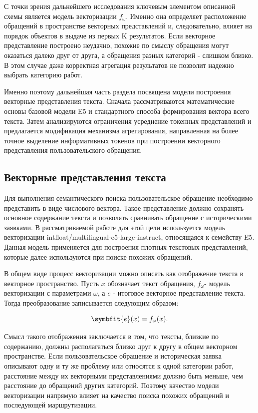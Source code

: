\documentclass[14pt,a4paper]{extarticle}
\numberwithin{figure}{section}
\numberwithin{table}{section}
\begin{document}
С точки зрения дальнейшего исследования ключевым элементом описанной
схемы является модель векторизации \(f_{\omega}\). Именно она определяет
расположение обращений в пространстве векторных представлений и, следовательно, влияет
на порядок объектов в выдаче из первых K результатов. Если векторное представление построено неудачно,
похожие по смыслу обращения могут оказаться далеко друг от друга, а
обращения разных категорий - слишком близко. В этом случае даже
корректная агрегация результатов не позволит надежно выбрать категорию
работ.

Именно поэтому дальнейшая часть раздела посвящена модели построения
векторные представления текста. Сначала рассматриваются математические основы
базовой модели E5 и стандартного способа формирования вектора всего
текста. Затем анализируются ограничения усреднение токенных представлений и предлагается
модификация механизма агрегирования, направленная на более точное выделение
информативных токенов при построении векторного представления пользовательского
обращения.

\subsection{Векторные представления текста}

Для выполнения семантического поиска пользовательское обращение
необходимо представить в виде числового вектора. Такое представление
должно сохранять основное содержание текста и позволять сравнивать
обращение с историческими заявками. В рассматриваемой работе для этой
цели используется модель векторизации
intfloat/multilingual-e5-large-instruct, относящаяся к семейству E5.
Данная модель применяется для построения плотных текстовых
представлений, которые далее используются при поиске похожих обращений.

В общем виде процесс векторизации можно описать как отображение текста в
векторное пространство. Пусть \(x\) обозначает текст обращения,
\(f_{\omega}\)- модель векторизации с параметрами \(\omega\), а \(e\) -
итоговое векторное представление текста. Тогда преобразование записывается следующим
образом:

\begin{equation}\symbfit{e}(x)=f_{\omega}(x).\end{equation}

Смысл такого отображения заключается в том, что тексты, близкие по
содержанию, должны располагаться близко друг к другу в общем векторном
пространстве. Если пользовательское обращение и историческая заявка
описывают одну и ту же проблему или относятся к одной категории работ,
расстояние между их векторными представлениями должно быть меньше, чем
расстояние до обращений других категорий. Поэтому качество модели
векторизации напрямую влияет на качество поиска похожих обращений и
последующей маршрутизации.
\end{document}

